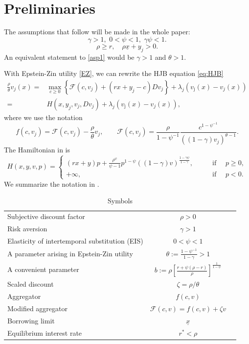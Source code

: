 \documentclass[11pt]{article}
\numberwithin{equation}{section}
\theoremstyle{definition}
\newcommand{\ux}{{\underline x}}
\newcommand{\beq}{\begin{equation}}
\newcommand{\eeq}{\end{equation}}
\newcommand{\g}{\gamma}
\newcommand{\p}{\psi}
\newcommand{\z}{\zeta}
\theoremstyle{plain}
\begin{document}
\section{Preliminaries}\label{Sec: Preliminaries}
The assumptions that follow will be made in the whole paper:
\beq\label{asp1}
\g>1,\,\,{}{0<\p<1},\,\,\g \p< 1.
\eeq
$$
\rho\geq r,\quad \rho \ux+y_j>0.
$$
An equivalent statement to \eqref{asp1} would be $\g>1$ and $\theta>1$. \par
 With Epstein-Zin utility \eqref{EZ}, we can rewrite the HJB equation \eqref{eq:HJB}
	\beq\label{HJB}
	\begin{aligned}
	\frac{\rho}{\theta} v_j(x)={}& \max_{c\ge 0} \left\{ \mathcal{F}(c,v_j) +(rx +y_j- c)Dv_j \right\}+\lambda_j(v_{\bar \jmath}(x)-v_j(x))\\
	={}& H(x,y_j,v_j,Dv_j)+\lambda_j(v_{\bar \jmath}(x)-v_j(x)),
	\end{aligned}
	\eeq
	where we use the notation
	\beq\label{EZ flow}
	f(c,v_j)=\mathcal{F}(c,v_j)-\frac{\rho}{\theta} v_j,\qquad \mathcal{F}(c,v_j)=\frac{\rho}{1-\p^{-1}}\frac{c^{1-\p^{-1}}}{((1-\g)v_j)^{\theta-1}}.
	\eeq
The Hamiltonian in  is
	\begin{equation}\label{def H}
  H(x,y,v,p)=\left\{
      \begin{aligned}
       (rx +y)p+\frac{\rho^{\p}}{\p-1} p^{1-\p}((1-\g)v)^{\frac{1-\g \p}{1-\g}},\quad \quad & \text{if }\quad p\geq 0,\\
       +\infty, \quad \quad  & \text{if }\quad p< 0.
     \end{aligned}
   \right.
\end{equation}
We summarize the notation in . 
\begin{table}[h!]
    \centering
    \caption{Symbols}
    \label{tab1}
    \begin{tabular}{l c c}
        \toprule
        {}{Subjective discount factor} & $\rho>0$ \\
        Risk aversion  & $\gamma>1$  \\
        {}{Elasticity of intertemporal substitution} (EIS) &{}{$0<\psi<1$}\\
        A parameter arising in Epstein-Zin utility &$\theta:=\frac{1-\p^{-1}}{1-\g}>1$\\
        A convenient parameter &$b:= \rho\left[\frac{r+\p(\rho-r)}{\rho}\right]^{\frac{1}{1-\p}}$\\
        Scaled discount &$\z=\rho/\theta$\\
        Aggregator & $f(c,v)$\\
        Modified aggregator & $ \mathcal{F}(c,v)=f(c,v)+\z v$\\
        Borrowing limit & $\ux$ \\
        Equilibrium interest rate & $r^*< \rho$\\
        \bottomrule
    \end{tabular}
\end{table}\par
\end{document}
